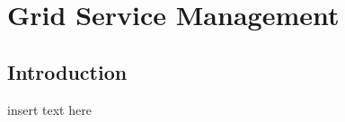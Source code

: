 \graphicspath{{chapt_dutch/}{intro/}{chapt2/}{chapt3/}{chapt4/}{chapt5/}}

\renewcommand\evenpagerightmark{{\scshape\small Chapter 4}}
\renewcommand\oddpageleftmark{{\scshape\small Grid Service Management}}

\renewcommand{\bibname}{References}

\hyphenation{}

\chapter[Grid Service Management]%
{Grid Service Management}
\label{ch4}

\section{Introduction}

insert text here

\clearpage
%
%




\clearpage{\pagestyle{empty}\cleardoublepage}
